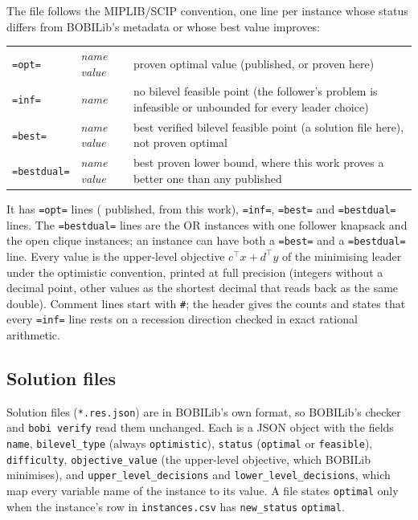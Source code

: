 The file follows the MIPLIB/SCIP convention, one line per instance whose
status differs from BOBILib's metadata or whose best value improves:
\begin{center}
\small
\begin{tabular}{@{}ll>{\raggedright\arraybackslash}p{4.1in}@{}}
\texttt{=opt=} & \emph{name value} & proven optimal value (published, or proven here)\\
\texttt{=inf=} & \emph{name} & no bilevel feasible point (the follower's problem is infeasible or unbounded for every leader choice)\\
\texttt{=best=} & \emph{name value} & best verified bilevel feasible point (a solution file here), not proven optimal\\
\texttt{=bestdual=} & \emph{name value} & best proven lower bound, where this work proves a better one than any published\\
\end{tabular}
\end{center}
It has \NumSoluOpt{} \texttt{=opt=} lines (\NumLitOptimal{} published,
\NumNewOptimal{} from this work), \NumSoluInf{} \texttt{=inf=}, \NumSoluBest{}
\texttt{=best=} and \NumSoluBestDual{} \texttt{=bestdual=} lines. The
\texttt{=bestdual=} lines are the \NumOrBetterLb{} OR instances with one
follower knapsack and the \NumCliqueOpen{} open clique instances; an instance
can have both a \texttt{=best=} and a \texttt{=bestdual=} line. Every value is
the upper-level objective $c^{\top}x+d^{\top}y$ of the minimising leader under
the optimistic convention, printed at full precision (integers without a
decimal point, other values as the shortest decimal that reads back as the
same double). Comment lines start with \texttt{\#}; the header gives the counts
and states that every \texttt{=inf=} line rests on a recession direction checked
in exact rational arithmetic.

\subsection{Solution files}

Solution files (\texttt{*.res.json}) are in BOBILib's own format, so BOBILib's
checker and \texttt{bobi verify} read them unchanged. Each is a JSON object
with the fields \texttt{name}, \texttt{bilevel\_type} (always
\texttt{optimistic}), \texttt{status} (\texttt{optimal} or \texttt{feasible}),
\texttt{difficulty}, \texttt{objective\_value} (the upper-level objective,
which BOBILib minimises), and \texttt{upper\_level\_decisions} and
\texttt{lower\_level\_decisions}, which map every variable name of the
instance to its value. A file states \texttt{optimal} only when the instance's
row in \texttt{instances.csv} has \texttt{new\_status} \texttt{optimal}.

